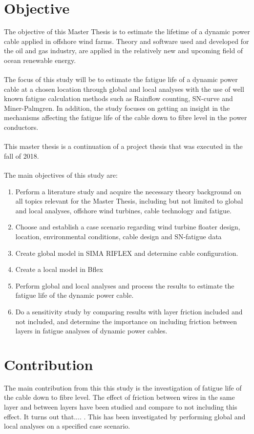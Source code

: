 \section{Objective}
The objective of this Master Thesis is to estimate the lifetime of a dynamic power cable applied in offshore wind farms. Theory and software used and developed for the oil and gas industry, are applied in the relatively new and upcoming field of ocean renewable energy.\\\\
The focus of this study will be to estimate the fatigue life of a dynamic power cable at a chosen location through global and local analyses with the use of well known fatigue calculation methods such as Rainflow counting, SN-curve and Miner-Palmgren.  In addition, the study focuses on getting an insight in the mechanisms affecting the fatigue life of the cable down to fibre level in the power conductors. \\\\
This master thesis is a continuation of a project thesis that was executed in the fall of 2018.\\\\
The main objectives of this study are:
\begin{enumerate}
    \item Perform a literature study and acquire the necessary theory background on all topics relevant for the Master Thesis, including but not limited to global and local analyses, offshore wind turbines, cable technology and fatigue.
    \item Choose and establish a case scenario regarding wind turbine floater design, location, environmental conditions, cable design and SN-fatigue data
    \item Create global model in SIMA RIFLEX and determine cable configuration. 
    \item Create a local model in Bflex
    \item Perform global and local analyses and process the results to estimate the fatigue life of the dynamic power cable.
    \item Do a sensitivity study by comparing results with layer friction included and not included, and determine the importance on including friction between layers in fatigue analyses of dynamic power cables.  
\end{enumerate} 

\section{Contribution}
The main contribution from this this study is the investigation of fatigue life of the cable down to fibre level. The effect of friction between wires in the same layer and between layers have been studied and compare to not including this effect. It turns out that.... . This has been investigated by performing global and local analyses on a specified case scenario. 
